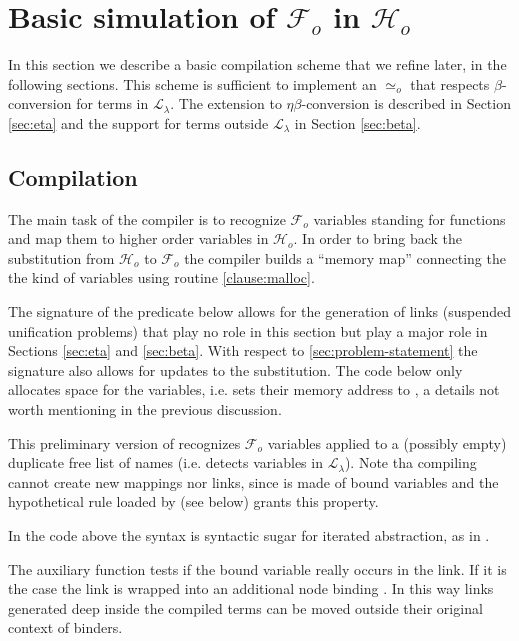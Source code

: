 \documentclass[sigconf,natbib=false,review]{acmart}
\newcommand{\UnifRel}{\ensuremath{\simeq}}
\newcommand{\Uo}{\ensuremath{\UnifRel_o}\xspace}
\newcommand{\llambda}{\ensuremath{\mathcal{L}_\lambda}\xspace}
\newcommand{\Fo}{\ensuremath{\mathcal{F}_{\!o}\xspace}} %
\newcommand{\Ho}{\ensuremath{\mathcal{H}_o}\xspace}
\begin{document}
\section[Compilation: fo\_tm to tm]{Basic simulation of \Fo{} in \Ho{}}
\label{sec:compilation}

In this section we describe a basic compilation scheme that we refine
later, in the following sections. This scheme is sufficient to implement
an \Uo{} that respects $\beta$-conversion for terms in \llambda. The extension to
$\eta\beta$-conversion is described in Section \ref{sec:eta} and the support
for terms outside \llambda in Section \ref{sec:beta}.

\subsection{Compilation}

The main task of the compiler is to recognize \Fo{} variables standing
for functions and map them to higher order variables in \Ho.
In order to bring back the substitution from \Ho{} to \Fo{} the compiler
builds a ``memory map'' connecting the the kind of variables using routine
\ref{clause:malloc}.

The signature of the  predicate below allows for the generation of
links (suspended unification problems) that play no role in this section
but play a major role in Sections \ref{sec:eta} and \ref{sec:beta}.
With respect to \ref{sec:problem-statement} the signature also allows
for updates to the substitution.  The code below only allocates space
for the variables, i.e. sets their memory address to ,
a details not worth mentioning in the previous discussion.



\noindent
This preliminary version of  recognizes \Fo{} variables
applied to a (possibly empty) duplicate free list of names (i.e.
 detects variables in \llambda).
Note tha compiling  cannot create new mappings nor links, since 
is made of bound variables and the hypothetical rule loaded by 
(see below) grants this property.



\noindent
In the code above the syntax  is syntactic sugar for
iterated  abstraction, as in .

The auxiliary function  tests if the bound variable
 really occurs in the link. If it is the case the link is wrapped into
an additional  node binding . In this way links generated
deep inside the compiled terms can be moved outside their original context
of binders.
\end{document}
